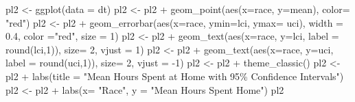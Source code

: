 \documentclass[
  11 pt,
]{article}
\newenvironment{Shaded}{\begin{snugshade}}{\end{snugshade}}
\newcommand{\AttributeTok}[1]{\textcolor[rgb]{0.77,0.63,0.00}{#1}}
\newcommand{\DecValTok}[1]{\textcolor[rgb]{0.00,0.00,0.81}{#1}}
\newcommand{\FloatTok}[1]{\textcolor[rgb]{0.00,0.00,0.81}{#1}}
\newcommand{\FunctionTok}[1]{\textcolor[rgb]{0.00,0.00,0.00}{#1}}
\newcommand{\NormalTok}[1]{#1}
\newcommand{\OtherTok}[1]{\textcolor[rgb]{0.56,0.35,0.01}{#1}}
\newcommand{\SpecialCharTok}[1]{\textcolor[rgb]{0.00,0.00,0.00}{#1}}
\newcommand{\StringTok}[1]{\textcolor[rgb]{0.31,0.60,0.02}{#1}}
\begin{document}
\begin{Shaded}
\begin{Highlighting}[]
\NormalTok{pl2 }\OtherTok{\textless{}{-}} \FunctionTok{ggplot}\NormalTok{(}\AttributeTok{data =}\NormalTok{ dt)}
\NormalTok{pl2 }\OtherTok{\textless{}{-}}\NormalTok{ pl2 }\SpecialCharTok{+} \FunctionTok{geom\_point}\NormalTok{(}\FunctionTok{aes}\NormalTok{(}\AttributeTok{x=}\NormalTok{race, }\AttributeTok{y=}\NormalTok{mean), }\AttributeTok{color=} \StringTok{"red"}\NormalTok{)}
\NormalTok{pl2 }\OtherTok{\textless{}{-}}\NormalTok{ pl2 }\SpecialCharTok{+} \FunctionTok{geom\_errorbar}\NormalTok{(}\FunctionTok{aes}\NormalTok{(}\AttributeTok{x=}\NormalTok{race, }\AttributeTok{ymin=}\NormalTok{lci, }\AttributeTok{ymax=}\NormalTok{ uci), }\AttributeTok{width =} \FloatTok{0.4}\NormalTok{, }\AttributeTok{color =}\StringTok{"red"}\NormalTok{, }\AttributeTok{size =} \DecValTok{1}\NormalTok{)}
\NormalTok{pl2 }\OtherTok{\textless{}{-}}\NormalTok{ pl2 }\SpecialCharTok{+} \FunctionTok{geom\_text}\NormalTok{(}\FunctionTok{aes}\NormalTok{(}\AttributeTok{x=}\NormalTok{race, }\AttributeTok{y=}\NormalTok{lci, }\AttributeTok{label =} \FunctionTok{round}\NormalTok{(lci,}\DecValTok{1}\NormalTok{)), }\AttributeTok{size=} \DecValTok{2}\NormalTok{, }\AttributeTok{vjust =} \DecValTok{1}\NormalTok{)}
\NormalTok{pl2 }\OtherTok{\textless{}{-}}\NormalTok{ pl2 }\SpecialCharTok{+} \FunctionTok{geom\_text}\NormalTok{(}\FunctionTok{aes}\NormalTok{(}\AttributeTok{x=}\NormalTok{race, }\AttributeTok{y=}\NormalTok{uci, }\AttributeTok{label =} \FunctionTok{round}\NormalTok{(uci,}\DecValTok{1}\NormalTok{)), }\AttributeTok{size=} \DecValTok{2}\NormalTok{, }\AttributeTok{vjust =} \SpecialCharTok{{-}}\DecValTok{1}\NormalTok{)}
\NormalTok{pl2 }\OtherTok{\textless{}{-}}\NormalTok{ pl2 }\SpecialCharTok{+} \FunctionTok{theme\_classic}\NormalTok{()}
\NormalTok{pl2 }\OtherTok{\textless{}{-}}\NormalTok{ pl2 }\SpecialCharTok{+} \FunctionTok{labs}\NormalTok{(}\AttributeTok{title =} \StringTok{"Mean Hours Spent at Home with 95\% Confidence Intervals"}\NormalTok{)}
\NormalTok{pl2 }\OtherTok{\textless{}{-}}\NormalTok{ pl2 }\SpecialCharTok{+} \FunctionTok{labs}\NormalTok{(}\AttributeTok{x=} \StringTok{"Race"}\NormalTok{, }\AttributeTok{y =} \StringTok{"Mean Hours Spent Home"}\NormalTok{)}
\NormalTok{pl2}
\end{Highlighting}
\end{Shaded}
\end{document}

